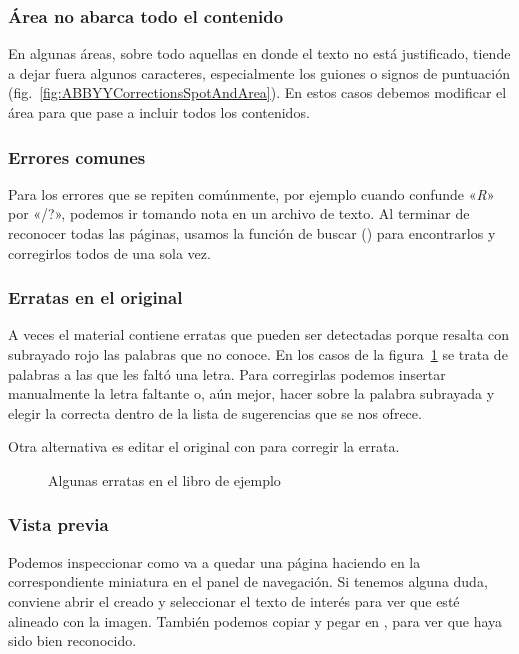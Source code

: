\documentclass[%
	a5paper,
	10pt,
	twoside,
	openright,
	final,
]{memoir}
\begin{document}
{	\subsubsection{Área no abarca todo el contenido} En algunas áreas, sobre todo aquellas en donde el texto no está justificado, \abbyy tiende a dejar fuera algunos caracteres, especialmente los guiones o signos de puntuación (fig.~\ref{fig:ABBYYCorrectionsSpotAndArea}). En estos casos debemos modificar el área para que pase a incluir todos los contenidos.

	\subsubsection{Errores comunes} Para los errores que se repiten comúnmente, por ejemplo cuando \abbyy confunde «\textit{R}» por «/?», podemos ir tomando nota en un archivo de texto. Al terminar de reconocer todas las páginas, usamos la función de buscar () para encontrarlos y corregirlos todos de una sola vez.

	\subsubsection{Erratas en el original} A veces el material contiene erratas que pueden ser detectadas porque \abbyy resalta con subrayado rojo las palabras que no conoce. En los casos de la figura~\ref{fig:ABBYYCorrectionsTypos} se trata de palabras a las que les faltó una letra. Para corregirlas podemos insertar manualmente la letra faltante o, aún mejor, hacer \keys{\rightclick} sobre la palabra subrayada y elegir la correcta dentro de la lista de sugerencias que se nos ofrece.

	Otra alternativa es editar el original con \gimp para corregir la errata.

	\begin{figure}
		\caption{Algunas erratas en el libro de ejemplo\label{fig:ABBYYCorrectionsTypos}}
	\end{figure}

	\subsubsection{Vista previa} Podemos inspeccionar como va a quedar una página haciendo  en la correspondiente miniatura en el panel de navegación. Si tenemos alguna duda, conviene abrir el \pdf creado y seleccionar el texto de interés para ver que esté alineado con la imagen. También podemos copiar y pegar en \notepad, para ver que haya sido bien reconocido.

}
\end{document}
